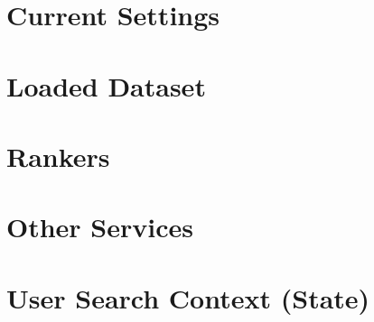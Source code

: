 \section{Current Settings}

\section{Loaded Dataset}

\section{Rankers}

\section{Other Services}

\section{User Search Context (State)}

